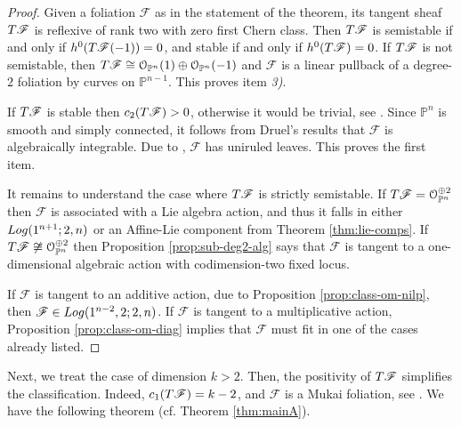 \documentclass[twoside]{amsart}
\numberwithin{equation}{section}
\newcommand{\p}[1]{{\mathbb{P}^{#1}}}
\newcommand{\opn}{{\mathcal O}_{\mathbb{P}^{n}}}
\newcommand{\pn}{{\mathbb{P}^{n}}}
\newcommand{\sF}{\mathscr{F}}
\newcommand{\tF}{{\rm T}\sF}
\newcommand{\logg}[3]{{\rm Log}(#1;#2,#3)}
\theoremstyle{definition}
\begin{document}
\begin{proof}
Given a foliation $\sF$ as in the statement of the theorem, its tangent sheaf $\tF$ is reflexive of rank two with zero first Chern class. Then $\tF$ is semistable if and only if $h^0(\tF(-1)) = 0$, and stable if and only if $h^0(\tF) = 0$.  If $\tF$ is not semistable, then $\tF \cong \opn(1)\oplus \opn(-1)$ and $\sF$ is a linear pullback of a degree-$2$ foliation by curves on $\p{n-1}$. This proves item \textit{3)}.


If $\tF$ is stable then $c_2(\tF) > 0$, otherwise it would be trivial, see \cite[Lemma 2.5]{JG}. Since $\pn$ is smooth and simply connected, it follows from Druel's results \cite[Theorem 6.1 and Proposition 8.4]{Druel} that $\sF$ is algebraically integrable. Due to \cite[Theorem 5.13]{LPT}, $\sF$ has uniruled leaves. This proves the first item. 

It remains to understand the case where $\tF$ is strictly semistable. If $\tF = \opn^{\oplus 2}$ then $\sF$ is associated with a Lie algebra action, and thus it falls in either $\logg{1^{n+1}}{2}{n}$ or an Affine-Lie component from Theorem \ref{thm:lie-comps}. If $\tF \not\cong \opn^{\oplus 2}$  then Proposition \ref{prop:sub-deg2-alg} says that $\sF$ is tangent to a one-dimensional algebraic action with codimension-two fixed locus. 

If $\sF$ is tangent to an additive action, due to Proposition \ref{prop:class-om-nilp}, then $\sF \in \logg{1^{n-2},2}{2}{n}$. If $\sF$ is tangent to a multiplicative action, Proposition \ref{prop:class-om-diag} implies that $\sF$ must fit in one of the cases already listed.
\end{proof}







Next, we treat the case of dimension $k>2$. Then, the positivity of $\tF$ simplifies the classification. Indeed,  $c_1(\tF) = k-2$, and $\sF$ is a Mukai foliation, see \cite{AD-mukai}. We have the following theorem (cf. Theorem \ref{thm:mainA}).
\end{document}
